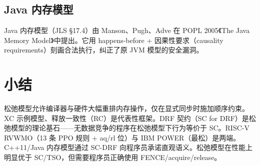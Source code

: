 \subsection{Java 内存模型}

Java 内存模型（JLS §17.4）由 Manson、Pugh、Adve 在 POPL 2005《The Java Memory Model》中提出。它用 happens-before + 因果性要求（causality requirements）刻画合法执行，纠正了原 JVM 模型的安全漏洞。

\section{小结}

松弛模型允许编译器与硬件大幅重排内存操作，仅在显式同步时施加顺序约束。XC 示例模型、释放一致性（RC）是代表性框架。DRF 契约（SC for DRF）是松弛模型的理论基石——无数据竞争的程序在松弛模型下行为等价于 SC。RISC-V RVWMO（13 条 PPO 规则 + aq/rl 位）与 IBM POWER（最松）是两端。C++11/Java 内存模型通过 SC-DRF 向程序员承诺直观语义。松弛模型在性能上明显优于 SC/TSO，但需要程序员正确使用 FENCE/acquire/release。


